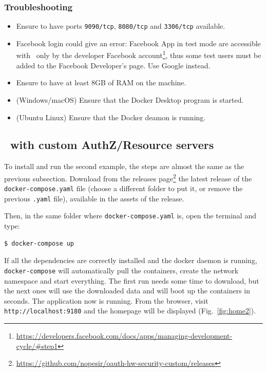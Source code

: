 \subsubsection{Troubleshooting}
\begin{itemize}
    \item Ensure to have ports \texttt{9090/tcp}, \texttt{8080/tcp} and \texttt{3306/tcp} available.
    \item Facebook login could give an error: Facebook App in test mode are accessible with \oauth\ only by the developer Facebook account\footnote{\url{https://developers.facebook.com/docs/apps/managing-development-cycle/\#step1}}, thus some test users must be added to the Facebook Developer's page. Use Google instead.
    \item Ensure to have at least 8GB of RAM on the machine.
    \item (Windows/macOS) Ensure that the Docker Desktop program is started.
    \item (Ubuntu Linux) Ensure that the Docker deamon is running.
\end{itemize}

\newpage

\subsection{\oauth\ with custom AuthZ/Resource servers}
To install and run the second example, the steps are almost the same as the previous subsection. Download from the releases page\footnote{\url{https://github.com/nopesir/oauth-hw-security-custom/releases}} the latest release of the \texttt{docker-compose.yaml} file (choose a different folder to put it, or remove the previous \texttt{.yaml} file), available in the assets of the release.

\noindent Then, in the same folder where \texttt{docker-compose.yaml} is, open the terminal and type:
\begin{lstlisting}[language=bash]
  $ docker-compose up
\end{lstlisting}

\noindent If all the dependencies are correctly installed and the docker daemon is running, \texttt{docker-compose} will automatically pull the containers, create the network namespace and start everything. 
The first run needs some time to download, but the next ones will use the downloaded data and will boot up the containers in seconds. The application now is running. From the browser, visit \texttt{http://localhost:9180} and the homepage will be displayed (Fig.~\ref{fig:home2}).

